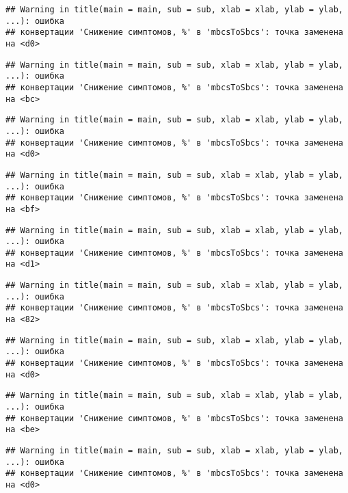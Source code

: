 \documentclass[
]{article}
\begin{document}
\begin{verbatim}
## Warning in title(main = main, sub = sub, xlab = xlab, ylab = ylab, ...): ошибка
## конвертации 'Снижение симптомов, %' в 'mbcsToSbcs': точка заменена на <d0>
\end{verbatim}

\begin{verbatim}
## Warning in title(main = main, sub = sub, xlab = xlab, ylab = ylab, ...): ошибка
## конвертации 'Снижение симптомов, %' в 'mbcsToSbcs': точка заменена на <bc>
\end{verbatim}

\begin{verbatim}
## Warning in title(main = main, sub = sub, xlab = xlab, ylab = ylab, ...): ошибка
## конвертации 'Снижение симптомов, %' в 'mbcsToSbcs': точка заменена на <d0>
\end{verbatim}

\begin{verbatim}
## Warning in title(main = main, sub = sub, xlab = xlab, ylab = ylab, ...): ошибка
## конвертации 'Снижение симптомов, %' в 'mbcsToSbcs': точка заменена на <bf>
\end{verbatim}

\begin{verbatim}
## Warning in title(main = main, sub = sub, xlab = xlab, ylab = ylab, ...): ошибка
## конвертации 'Снижение симптомов, %' в 'mbcsToSbcs': точка заменена на <d1>
\end{verbatim}

\begin{verbatim}
## Warning in title(main = main, sub = sub, xlab = xlab, ylab = ylab, ...): ошибка
## конвертации 'Снижение симптомов, %' в 'mbcsToSbcs': точка заменена на <82>
\end{verbatim}

\begin{verbatim}
## Warning in title(main = main, sub = sub, xlab = xlab, ylab = ylab, ...): ошибка
## конвертации 'Снижение симптомов, %' в 'mbcsToSbcs': точка заменена на <d0>
\end{verbatim}

\begin{verbatim}
## Warning in title(main = main, sub = sub, xlab = xlab, ylab = ylab, ...): ошибка
## конвертации 'Снижение симптомов, %' в 'mbcsToSbcs': точка заменена на <be>
\end{verbatim}

\begin{verbatim}
## Warning in title(main = main, sub = sub, xlab = xlab, ylab = ylab, ...): ошибка
## конвертации 'Снижение симптомов, %' в 'mbcsToSbcs': точка заменена на <d0>
\end{verbatim}
\end{document}

